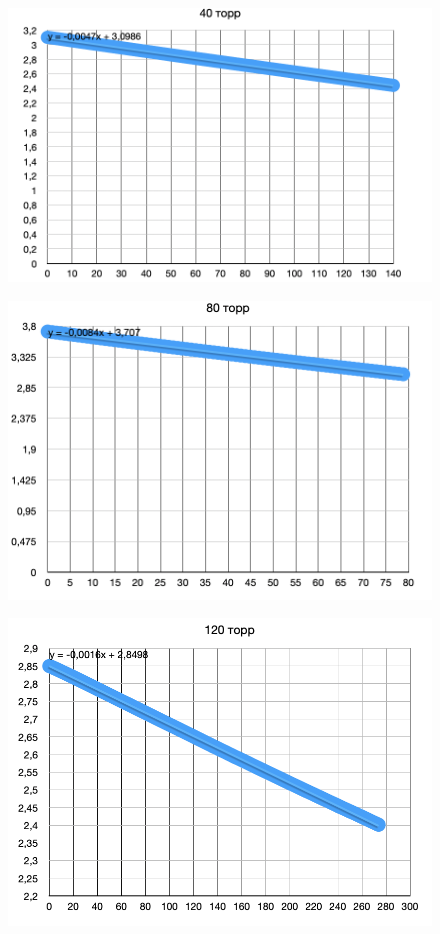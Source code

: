 \begin{figure}[h]
    \includegraphics*[width = 0.8\linewidth]{40.png}
\end{figure}
\begin{figure}[h]
    \includegraphics*[width = 0.8\linewidth]{80.png}
\end{figure}
\begin{figure}[h]
    \includegraphics*[width = 0.8\linewidth]{120.png}
\end{figure}
